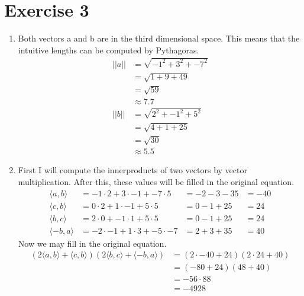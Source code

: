 \documentclass[a4paper]{article}
\begin{document}
\section*{Exercise 3}
\begin{enumerate}
  \item Both vectors a and b are in the third dimensional space. This means that the intuitive lengths can be computed by Pythagoras.
  \begin{align*}
    ||a|| &= \sqrt{-1^2 + 3^2 + -7^2} \\
          &= \sqrt{1 + 9 + 49} \\
          &= \sqrt{59} \\
          &\approx 7.7 \\
    ||b|| &= \sqrt{2^2 + -1^2 + 5^2} \\
          &= \sqrt{4 + 1 + 25} \\
          &= \sqrt{30} \\
          &\approx 5.5
  \end{align*}
  \item First I will compute the innerproducts of two vectors by vector multiplication. After this, these values will be filled in the original equation.
  \begin{align*}
    \langle a, b \rangle &= -1 \cdot 2 + 3 \cdot -1 + -7 \cdot 5 &= -2 -3 - 35 &= -40 \\
    \langle c, b \rangle &= 0 \cdot 2 + 1 \cdot -1 + 5 \cdot 5 &= 0 - 1 + 25 &= 24 \\
    \langle b, c \rangle &= 2 \cdot 0 + -1 \cdot 1 + 5 \cdot 5 &= 0 - 1 + 25 &= 24 \\
    \langle -b, a \rangle &= -2 \cdot -1 + 1 \cdot 3 + -5 \cdot -7 &= 2 + 3 + 35 &= 40
  \end{align*}
  Now we may fill in the original equation.
  \begin{align*}
    (2 \langle a, b \rangle + \langle c, b \rangle)(2 \langle b, c \rangle + \langle −b, a \rangle) &=
    (2 \cdot -40 + 24)(2 \cdot 24 + 40) \\
    &= (-80 + 24)(48 + 40) \\
    &= -56 \cdot 88 \\
    &= -4928
  \end{align*}
\end{enumerate}
\end{document}
